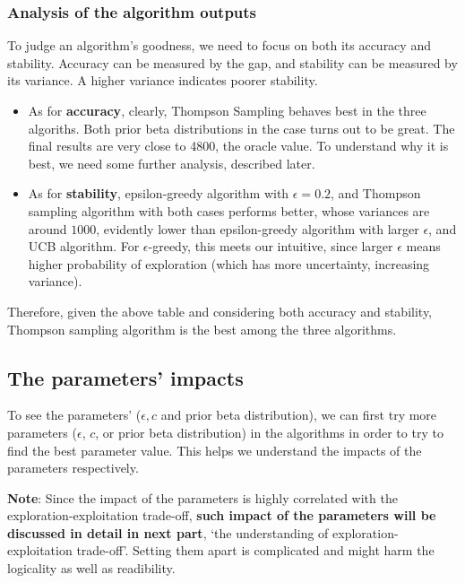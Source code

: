 \documentclass[11pt]{article}
\begin{document}
    \hypertarget{analysis-of-the-algorithm-outputs}{%
\subsubsection{Analysis of the algorithm
outputs}\label{analysis-of-the-algorithm-outputs}}

To judge an algorithm's goodness, we need to focus on both its accuracy
and stability. Accuracy can be measured by the gap, and stability can be
measured by its variance. A higher variance indicates poorer stability.

\begin{itemize}
\item
  As for \textbf{accuracy}, clearly, Thompson Sampling behaves best in the three
  algoriths. Both prior beta distributions in the case turns out to be
  great. The final results are very close to 4800, the oracle value. To
  understand why it is best, we need some further analysis, described
  later.
\item
  As for \textbf{stability}, epsilon-greedy algorithm with \(\epsilon=0.2\), and
  Thompson sampling algorithm with both cases performs better, whose
  variances are around \(1000\), evidently lower than epsilon-greedy
  algorithm with larger \(\epsilon\), and UCB algorithm. For
  \(\epsilon\)-greedy, this meets our intuitive, since larger
  \(\epsilon\) means higher probability of exploration (which has more
  uncertainty, increasing variance).
\end{itemize}

Therefore, given the above table and considering both accuracy and
stability, Thompson sampling algorithm is the best among the three
algorithms.

    \hypertarget{the-parameters-impacts}{%
\subsection{The parameters' impacts}\label{the-parameters-impacts}}

To see the parameters' (\(\epsilon, c\) and prior beta distribution), we
can first try more parameters (\(\epsilon\), \(c\), or prior beta
distribution) in the algorithms in order to try to find the best
parameter value. This helps we understand the impacts of the parameters
respectively.

\textbf{Note}: Since the impact of the parameters is highly correlated with the exploration-exploitation trade-off, \textbf{such impact of the parameters will be discussed in detail in next part}, `the understanding of exploration-exploitation trade-off'. 
Setting them apart is complicated and might harm the logicality as well as readibility. 
\end{document}
